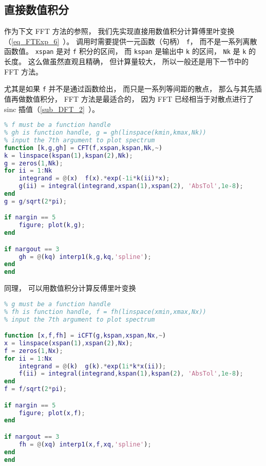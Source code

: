 

\subsection{直接数值积分}
作为下文 FFT 方法的参照， 我们先实现直接用数值积分计算傅里叶变换（\autoref{eq_FTExp_6}~）。 调用时需要提供一元函数（句柄） \verb|f|， 而不是一系列离散函数值。 \verb|xspan| 是对 \verb|f| 积分的区间， 而 \verb|kspan| 是输出中 \verb|k| 的区间， \verb|Nk| 是 \verb|k| 的长度。 这么做虽然直观且精确， 但计算量较大， 所以一般还是用下一节中的 FFT 方法。

尤其是如果 \verb|f| 并不是通过函数给出， 而只是一系列等间距的散点， 那么与其先插值再做数值积分， FFT 方法是最适合的， 因为 FFT 已经相当于对散点进行了 sinc 插值（\autoref{sub_DFT_2}~）。

\begin{lstlisting}[language=matlab, caption=CFT.m]
% Continuous Fourier Transform by Integration
% f must be a function handle
% gh is function handle, g = gh(linspace(kmin,kmax,Nk))
% input the 7th argument to plot spectrum
function [k,g,gh] = CFT(f,xspan,kspan,Nk,~)
k = linspace(kspan(1),kspan(2),Nk);
g = zeros(1,Nk);
for ii = 1:Nk
    integrand = @(x)  f(x).*exp(-1i*k(ii)*x);
    g(ii) = integral(integrand,xspan(1),xspan(2), 'AbsTol',1e-8);
end
g = g/sqrt(2*pi);

if nargin == 5
    figure; plot(k,g);
end

if nargout == 3
    gh = @(kq) interp1(k,g,kq,'spline');
end
end
\end{lstlisting}
同理， 可以用数值积分计算反傅里叶变换
\begin{lstlisting}[language=matlab, caption=iCFT.m]
% Continuous Fourier Transform by Integration
% g must be a function handle
% fh is function handle, f = fh(linspace(xmin,xmax,Nx))
% input the 7th argument to plot spectrum

function [x,f,fh] = iCFT(g,kspan,xspan,Nx,~)
x = linspace(xspan(1),xspan(2),Nx);
f = zeros(1,Nx);
for ii = 1:Nx
    integrand = @(k)  g(k).*exp(1i*k*x(ii));
    f(ii) = integral(integrand,kspan(1),kspan(2), 'AbsTol',1e-8);
end
f = f/sqrt(2*pi);

if nargin == 5
    figure; plot(x,f);
end

if nargout == 3
    fh = @(xq) interp1(x,f,xq,'spline');
end
end
\end{lstlisting}

